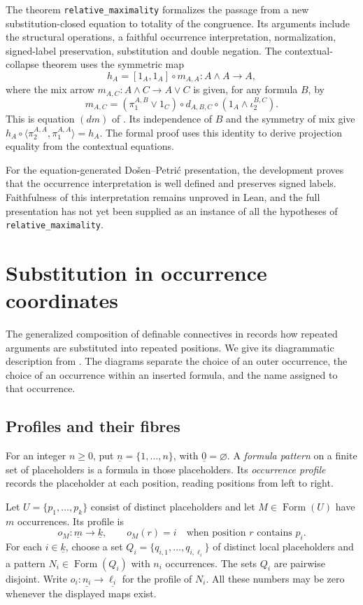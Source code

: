 \documentclass[11pt]{article}
\newcommand{\FormulaSet}{\operatorname{Form}}
\begin{document}
The theorem \texttt{relative\_maximality} formalizes the passage from a
new substitution-closed equation to totality of the congruence.
Its arguments include the structural operations, a faithful occurrence
interpretation, normalization, signed-label preservation, substitution
and double negation. The contextual-collapse theorem uses the symmetric
map
\[
 h_A=[1_A,1_A]\circ m_{A,A}:A\wedge A\longrightarrow A,
\]
where the mix arrow $m_{A,C}:A\wedge C\to A\vee C$ is given, for any
formula $B$, by
\[
 m_{A,C}=(\pi_1^{A,B}\vee1_C)\circ d_{A,B,C}
              \circ(1_A\wedge\iota_2^{B,C}).
\]
This is equation $(dm)$ of \cite[\S11.1, p.~234]{DP}.
Its independence of $B$ and the symmetry of mix give
$h_A\circ\langle\pi_2^{A,A},\pi_1^{A,A}\rangle=h_A$.
The formal proof uses this identity to derive projection equality
from the contextual equations.

For the equation-generated Do\v{s}en--Petri\'c presentation, the
development proves that the occurrence interpretation is well defined
and preserves signed labels. Faithfulness of this
interpretation remains unproved in Lean, and the full presentation has
not yet been supplied as an instance of all the hypotheses of
\texttt{relative\_maximality}.

\appendix
\section{Substitution in occurrence coordinates}\label{app:substitution}

The generalized composition of definable connectives in
\cite[\S2.5, pp.~45--46]{DP} records how repeated arguments are
substituted into repeated positions. We give its diagrammatic description
from \cite[\S\S9.2--9.3]{Notation}. The diagrams separate the choice of
an outer occurrence, the choice of an occurrence within an inserted
formula, and the name assigned to that occurrence.

\subsection{Profiles and their fibres}\label{app:profiles}

For an integer $n\geq0$, put $\underline n=\{1,\ldots,n\}$, with
$\underline0=\varnothing$. A \emph{formula pattern} on a finite set
of placeholders is a formula in those placeholders. Its
\emph{occurrence profile} records the placeholder at each position,
reading positions from left to right.

Let $U=\{p_1,\ldots,p_k\}$ consist of distinct placeholders and let
$M\in\FormulaSet(U)$ have $m$ occurrences. Its profile is
\[
 o_M:\underline m\longrightarrow\underline k,
 \qquad o_M(r)=i\quad\text{when position $r$ contains $p_i$}.
\]
For each $i\in\underline k$, choose a set
$Q_i=\{q_{i,1},\ldots,q_{i,\ell_i}\}$ of distinct local placeholders and a
pattern $N_i\in\FormulaSet(Q_i)$ with $n_i$ occurrences. The sets
$Q_i$ are pairwise disjoint. Write
$o_i:\underline{n_i}\to\underline{\ell_i}$ for the profile of $N_i$.
All these numbers may be zero whenever the displayed maps exist.
\end{document}
